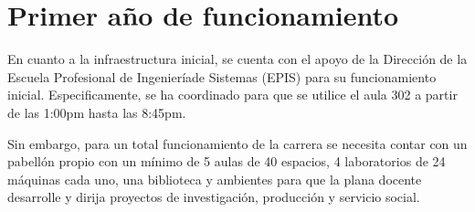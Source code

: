 \section{Primer año de funcionamiento}

En cuanto a la infraestructura inicial, se cuenta con el apoyo de la Dirección de la Escuela Profesional de Ingenieríade Sistemas (EPIS) para su funcionamiento inicial. Especificamente, se ha coordinado para que se utilice el aula 302 a partir de las 1:00pm hasta las 8:45pm.

Sin embargo, para un total funcionamiento de la carrera se necesita contar con un pabellón propio con un mínimo de 5 aulas de 40 espacios, 4 laboratorios de 24 máquinas cada uno, una biblioteca y ambientes para que la plana docente desarrolle y dirija proyectos de investigación, producción y servicio social.

